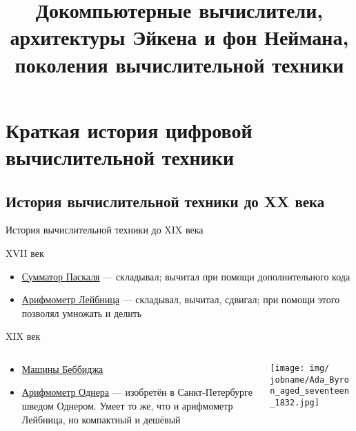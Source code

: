 \documentclass[xetex,aspectratio=43]{beamer}
\title[Докомпьютерные, Эйкен, фон Нейман]{Докомпьютерные вычислители,\\ архитектуры Эйкена и фон Неймана,\\поколения вычислительной техники}
\begin{document}
\titleslide

\tocslide

\section{Краткая история цифровой
		вычислительной техники}

\subsection{История вычислительной техники до XX века}

\begin{frame}{История вычислительной техники до XIX века}
	\begin{block}{XVII век}
		\begin{itemize}
			\item
			\href{https://en.wikipedia.org/wiki/Pascal\%27s_calculator\#Addition}{Сумматор
				Паскаля} --- складывал; вычитал при помощи дополнительного кода
			\item
			\href{https://en.wikipedia.org/wiki/Stepped_reckoner\#Operation}{Арифмометр
				Лейбница} --- складывал, вычитал, сдвигал; при помощи этого позволял
			умножать и делить
		\end{itemize}
	\end{block}

	\pause

	\begin{block}{XIX век}
		\begin{columns}
		\begin{column}{0.7\textwidth}
			\begin{itemize}
				\item
				\href{https://en.wikipedia.org/wiki/Charles_Babbage\#Computing_pioneer}{Машины
					Беббиджа}

				\item
				\href{https://en.wikipedia.org/wiki/Odhner_Arithmometer}{Арифмометр
					Однера} --- изобретён в Санкт-Петербурге шведом Однером. Умеет то же,
				что и арифмометр Лейбница, но компактный и дешёвый
			\end{itemize}
		\end{column}
		\begin{column}{0.3\textwidth}
			\texttt{[image: img/\\jobname/Ada\_Byron\_aged\_seventeen\_1832.jpg]}
		\end{column}
		\end{columns}
	\end{block}
\end{frame}
\end{document}
